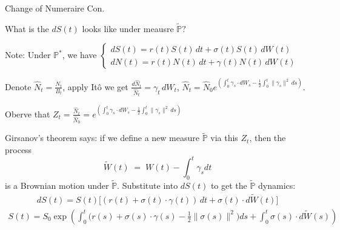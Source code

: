 \documentclass{beamer}
\begin{document}
\begin{frame}{Change of Numeraire Con.}

    {\footnotesize \footnotesize
    \par What is the $dS(t)$ looks like under meausre $\tilde{\mathbb{P}}?$
    \par Note: Under $\mathbb{P}^*$, we have $\begin{cases}
        dS(t) = r(t) S(t) \,dt + \sigma(t) S(t) \,dW(t)\\dN(t) = r(t) N(t) \,dt + \gamma(t) N(t) \,dW(t)
    \end{cases}$
    \par Denote $\widehat N_t = \frac{N_t}{B_t}$, apply Itô we get
     $\frac{d\widehat N_t}{\widehat N_t}=\gamma_t\,dW_t$, $\widehat N_t
    = \widehat N_0 e^{\left(
      \int_0^t \gamma_s \cdot dW_s
      - \frac{1}{2} \int_0^t \|\gamma_s\|^2 \, ds
    \right)}.$
    \par Oberve that $Z_t  = \frac{\widehat N_t}{\widehat N_0} = e^{\left(
      \int_0^t \gamma_s \cdot dW_s
      - \frac{1}{2} \int_0^t \|\gamma_s\|^2 \, ds
    \right)}$\pause
    \par Girsanov's theorem says: if we define a new measure $\tilde{\mathbb{P}}$ via this $Z_t$, then the process
            \[
        \tilde{W}(t) \;=\; W(t) - \int_{0}^{t}\gamma_sdt
            \]
        is a Brownian motion under $\tilde{\mathbb{P}}$. Substitute into $dS(t)$ to get the $\tilde{\mathbb{P}}$ dynamics:
        \begin{align*}
            dS(t) = S(t)\Big[ (r(t) + \sigma(t) \cdot \gamma(t))\,dt + \sigma(t)  \cdot d\tilde{W}(t) \Big]
        \end{align*}
        \begin{align*}
            S(t)
           = S_0 \exp\!\left(
            \int_0^t \!\Big(r(s) + \sigma(s) \!\cdot\!\gamma(s) - \tfrac12 \|\sigma(s)\|^2\Big) ds
            + \int_0^t \!\sigma(s) \!\cdot\! d\tilde{W}(s)\right)
        \end{align*}
    }
    
\end{frame}
\end{document}
